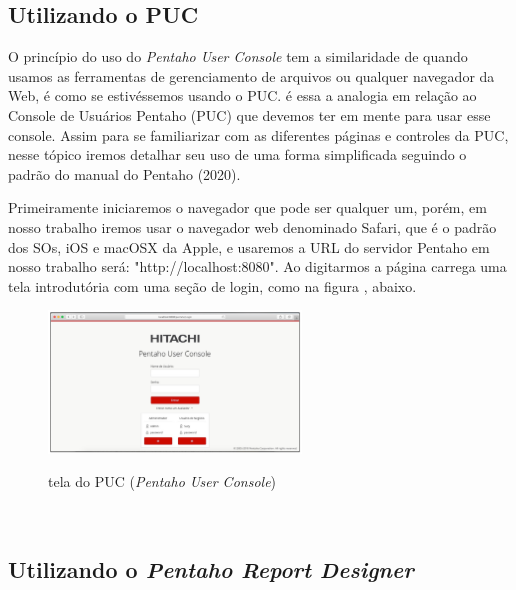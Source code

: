 
\subsection{Utilizando o PUC}

O princ\'{i}pio do uso do \textit{Pentaho User Console} tem a similaridade de quando usamos as ferramentas de gerenciamento de arquivos ou qualquer navegador da Web, \'{e} como se estiv\'{e}ssemos usando o PUC. \'{e} essa a analogia em rela\c{c}\~{a}o ao Console de Usu\'{a}rios Pentaho (PUC) que devemos ter em mente para usar esse console. Assim para se familiarizar com as diferentes p\'{a}ginas e controles da PUC, nesse t\'opico iremos detalhar seu uso de uma forma simplificada seguindo o padr\~{a}o do manual do Pentaho (2020).

Primeiramente iniciaremos o navegador que pode ser qualquer um, por\'{e}m, em nosso trabalho iremos usar o navegador web denominado Safari, que \'{e} o padr\~{a}o dos SOs, iOS e macOSX da Apple, e usaremos a URL do servidor Pentaho em nosso trabalho ser\'{a}: "http://localhost:8080".  Ao digitarmos a p\'{a}gina carrega uma tela introdut\'oria com uma se\c{c}\~{a}o de login, como na figura , abaixo.

\begin{figure}[H]
	\vspace*{0,2cm}
    \centering
    \caption{tela do PUC (\textit{Pentaho User Console})}
    \includegraphics[width=0.6\textwidth]{./04-figuras/figura-puc}
    \label{fig:ilustfigpuc}
\end{figure}
\vspace*{-0,9cm}
{\raggedright {}} \\


\subsection{Utilizando o \textit{Pentaho Report Designer}}

